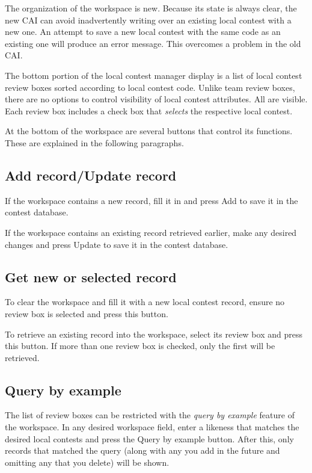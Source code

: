 \documentclass[11pt,letterpaper]{refart}
\def\ui#1{\textsf{#1}}
\begin{document}
The organization of the workspace is new. Because its state is always
clear, the new CAI can avoid inadvertently writing over an existing
local contest with a new one. An attempt to save a new local contest
with the same code as an existing one will produce an error
message. This overcomes a problem in the old CAI.

The bottom portion of the local contest manager display is a list of
local contest review boxes sorted according to local contest code.
Unlike team review boxes, there are no options to control visibility
of local contest attributes. All are visible. Each review box includes
a check box that \emph{selects} the respective local contest.

At the bottom of the workspace are several buttons that control its
functions. These are explained in the following paragraphs.

\subsection{Add record/Update record}
If the workspace contains a new record, fill it in and press \ui{Add}
to save it in the contest database.

If the workspace contains an existing record retrieved earlier, make
any desired changes and press \ui{Update} to save it in the contest
database.

\subsection{Get new or selected record}
To clear the workspace and fill it with a new local contest record,
ensure no review box is selected and press this button.

To retrieve an existing record into the workspace, select its review
box and press this button. If more than one review box is checked,
only the first will be retrieved.

\subsection{Query by example}
\label{sec:qbe}
The list of review boxes can be restricted with the \emph{query by example} 
feature of the workspace. In any desired workspace field,
enter a likeness that matches the desired local contests and press the
\ui{Query by example} button. After this, only records that matched
the query (along with any you add in the future and omitting any that
you delete) will be shown.
\end{document}
